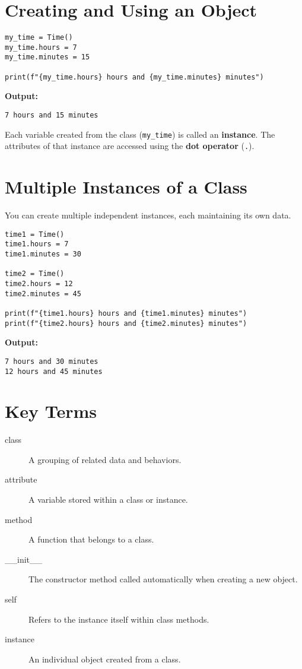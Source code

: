 \section{Creating and Using an Object}

\begin{verbatim}
my_time = Time()
my_time.hours = 7
my_time.minutes = 15

print(f"{my_time.hours} hours and {my_time.minutes} minutes")
\end{verbatim}

\textbf{Output:}
\begin{verbatim}
7 hours and 15 minutes
\end{verbatim}

Each variable created from the class (\texttt{my\_time}) is called an \textbf{instance}.
The attributes of that instance are accessed using the \textbf{dot operator} (\texttt{.}).

\section{Multiple Instances of a Class}

You can create multiple independent instances, each maintaining its own data.

\begin{verbatim}
time1 = Time()
time1.hours = 7
time1.minutes = 30

time2 = Time()
time2.hours = 12
time2.minutes = 45

print(f"{time1.hours} hours and {time1.minutes} minutes")
print(f"{time2.hours} hours and {time2.minutes} minutes")
\end{verbatim}

\textbf{Output:}
\begin{verbatim}
7 hours and 30 minutes
12 hours and 45 minutes
\end{verbatim}

\section{Key Terms}

\begin{description}
    \item[class] A grouping of related data and behaviors.
    \item[attribute] A variable stored within a class or instance.
    \item[method] A function that belongs to a class.
    \item[\_\_init\_\_] The constructor method called automatically when creating a new object.
    \item[self] Refers to the instance itself within class methods.
    \item[instance] An individual object created from a class.
\end{description}

